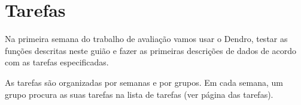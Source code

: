 \documentclass[paper=a4, fontsize=11pt]{scrartcl} %
\numberwithin{equation}{section} %
\numberwithin{figure}{section} %
\numberwithin{table}{section} %
\begin{document}
\section{Tarefas} %
\label{sec:tasks}

Na primeira semana do trabalho de avaliação vamos usar o Dendro, testar as funções descritas neste guião e fazer as primeiras descrições de dados de acordo com as tarefas especificadas.

As tarefas são organizadas por semanas e por grupos. Em cada semana, um grupo procura as suas tarefas na lista de tarefas (ver página das tarefas).



%
%
\end{document}
